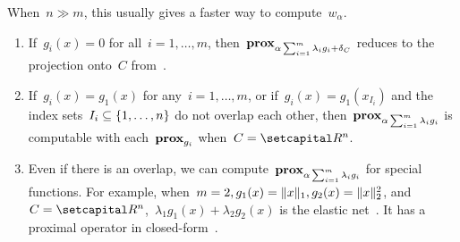 \documentclass[../../main]{subfiles}
\begin{document}
When~$n \gg m$, this usually gives a faster way to compute~$w_\alpha$.
\begin{example}
    \begin{enumerate}
        \item If~$g_i(x) = 0$ for all~$i = 1, \dots, m$, then~$\prox_{\alpha \sum_{i = 1}^{m} \lambda_i g_i + \indicator_C}$ reduces to the projection onto~$C$ from~.
        \item If~$g_i(x) = g_1(x)$ for any~$i = 1, \dots, m$, or if~$g_i(x) = g_1(x_{I_i})$ and the index sets~$I_i \subseteq \set*{1, \dots, n}$ do not overlap each other, then~$\prox_{\alpha \sum_{i = 1}^{m} \lambda_i g_i}$ is computable with each~$\prox_{g_i}$ when~$C = \setR^n$.
        \item Even if there is an overlap, we can compute~$\prox_{\alpha \sum_{i = 1}^{m} \lambda_i g_i}$ for special functions.
              For example, when~$m = 2, g_1(x) = \norm{x}_1, g_2(x) = \norm{x}_2^2$, and~$C = \setR^n$,~$\lambda_1 g_1(x) + \lambda_2 g_2(x)$ is the elastic net~\cite{Zou2005}.
              It has a proximal operator in closed-form~\cite[Section 6.5.3]{Parikh2014}.
    \end{enumerate}
\end{example}
\end{document}
